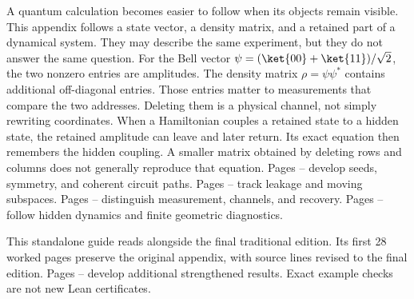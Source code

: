 A quantum calculation becomes easier to follow when its objects remain visible. This appendix follows a state vector, a density matrix, and a retained part of a dynamical system. They may describe the same experiment, but they do not answer the same question.
For the Bell vector $\psi=(\ket{00}+\ket{11})/\sqrt2$, the two nonzero entries are amplitudes. The density matrix $\rho=\psi\psi^*$ contains additional off-diagonal entries. Those entries matter to measurements that compare the two addresses. Deleting them is a physical channel, not simply rewriting coordinates.
When a Hamiltonian couples a retained state to a hidden state, the retained amplitude can leave and later return. Its exact equation then remembers the hidden coupling. A smaller matrix obtained by deleting rows and columns does not generally reproduce that equation.
Pages -- develop seeds, symmetry, and coherent circuit paths. Pages -- track leakage and moving subspaces. Pages -- distinguish measurement, channels, and recovery. Pages -- follow hidden dynamics and finite geometric diagnostics.

This standalone guide reads alongside the final traditional edition. Its first 28 worked pages preserve the original appendix, with source lines revised to the final edition. Pages -- develop additional strengthened results. Exact example checks are not new Lean certificates.

